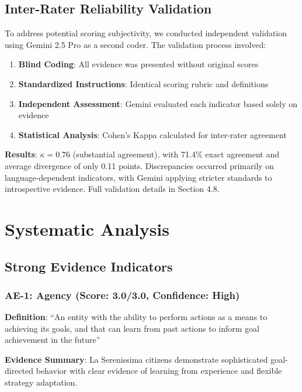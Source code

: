 \documentclass[12pt,a4paper]{article}
\begin{document}
\subsection{Inter-Rater Reliability Validation}

To address potential scoring subjectivity, we conducted independent validation using Gemini 2.5 Pro as a second coder. The validation process involved:

\begin{enumerate}
    \item \textbf{Blind Coding}: All evidence was presented without original scores
    \item \textbf{Standardized Instructions}: Identical scoring rubric and definitions  
    \item \textbf{Independent Assessment}: Gemini evaluated each indicator based solely on evidence
    \item \textbf{Statistical Analysis}: Cohen's Kappa calculated for inter-rater agreement
\end{enumerate}

\textbf{Results}: $\kappa = 0.76$ (substantial agreement), with 71.4\% exact agreement and average divergence of only 0.11 points. Discrepancies occurred primarily on language-dependent indicators, with Gemini applying stricter standards to introspective evidence. Full validation details in Section 4.8.

\section{Systematic Analysis}

\subsection{Strong Evidence Indicators}

\subsubsection{AE-1: Agency (Score: 3.0/3.0, Confidence: High)}

\textbf{Definition}: ``An entity with the ability to perform actions as a means to achieving its goals, and that can learn from past actions to inform goal achievement in the future''

\textbf{Evidence Summary}: La Serenissima citizens demonstrate sophisticated goal-directed behavior with clear evidence of learning from experience and flexible strategy adaptation.
\end{document}
